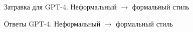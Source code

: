 \begin{figure}[ht]
  \centering
  \caption{Затравка для GPT-4. Неформальный $\rightarrow$ формальный стиль}
  \label{fig:gpt_lurk2wiki_prompt}
\end{figure}

\begin{figure}[ht]
  \centering
  \caption{Ответы GPT-4. Неформальный $\rightarrow$ формальный стиль}
  \label{fig:gpt_lurk2wiki_answers}
\end{figure}

